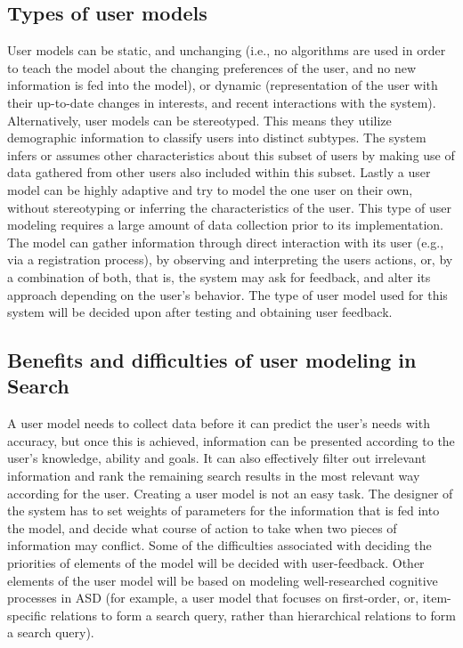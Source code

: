 \documentclass[10pt]{article}
\begin{document}
\subsection{Types of user models}
User models can be static, and unchanging (i.e., no algorithms are used in order to teach the model about the changing preferences of the user, and no new information is fed into the model), or dynamic (representation of the user with their up-to-date changes in interests, and recent interactions with the system). Alternatively, user models can be stereotyped. This means they utilize demographic information to classify users into distinct subtypes. The system infers or assumes other characteristics about this subset of users by making use of data gathered from other users also included within this subset. Lastly a user model can be highly adaptive and try to model the one user on their own, without stereotyping or inferring the characteristics of the user. This type of user modeling requires a large amount of data collection prior to its implementation.
\\The model can gather information through direct interaction with its user (e.g., via a registration process), by observing and interpreting the users actions, or, by a combination of both, that is, the system may ask for feedback, and alter its approach depending on the user’s behavior.
The type of user model used for this system will be decided upon after testing and obtaining user feedback.

\subsection{Benefits and difficulties of user modeling in Search}
A user model needs to collect data before it can predict the user’s needs with accuracy, but once this is achieved, information can be presented according to the user’s knowledge, ability and goals. It can also effectively filter out irrelevant information and rank the remaining search results in the most relevant way according for the user.
Creating a user model is not an easy task. The designer of the system has to set weights of parameters for the information that is fed into the model, and decide what course of action to take when two pieces of information may conflict. Some of the difficulties associated with deciding the priorities of elements of the model will be decided with user-feedback. Other elements of the user model will be based on modeling well-researched cognitive processes in ASD (for example, a user model that focuses on first-order, or, item-specific relations to form a search query, rather than hierarchical relations to form a search query).  
\end{document}
